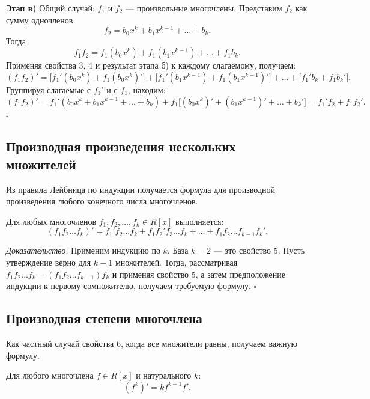 \documentclass[a4paper,12pt]{article}
\theoremstyle{definition}
\theoremstyle{plain}
\theoremstyle{remark}
\begin{document}
	\textbf{Этап в)} Общий случай: \( f_1 \) и \( f_2 \) — произвольные многочлены. Представим \( f_2 \) как сумму одночленов:
	\[
	f_2 = b_0 x^k + b_1 x^{k-1} + \dots + b_k.
	\]
	Тогда
	\[
	f_1 f_2 = f_1 (b_0 x^k) + f_1 (b_1 x^{k-1}) + \dots + f_1 b_k.
	\]
	Применяя свойства 3, 4 и результат этапа б) к каждому слагаемому, получаем:
	\[
	(f_1 f_2)' = \big[f_1' (b_0 x^k) + f_1 (b_0 x^k)'\big] + \big[f_1' (b_1 x^{k-1}) + f_1 (b_1 x^{k-1})'\big] + \dots + \big[f_1' b_k + f_1 b_k'\big].
	\]
	Группируя слагаемые с \( f_1' \) и с \( f_1 \), находим:
	\[
	(f_1 f_2)' = f_1' (b_0 x^k + b_1 x^{k-1} + \dots + b_k) + f_1 \big[(b_0 x^k)' + (b_1 x^{k-1})' + \dots + b_k'\big] = f_1' f_2 + f_1 f_2'.
	\]
	\hfill \(\square\)
	
	\subsection{Производная произведения нескольких множителей}
	
	Из правила Лейбница по индукции получается формула для производной произведения любого конечного числа многочленов.
	
	\begin{tcolorbox}[colback=blue!5, colframe=blue!40!black, title=Свойство 6]
		Для любых многочленов \( f_1, f_2, \dots, f_k \in R[x] \) выполняется:
		\[
		(f_1 f_2 \dots f_k)' = f_1' f_2 \dots f_k + f_1 f_2' f_3 \dots f_k + \dots + f_1 f_2 \dots f_{k-1} f_k'.
		\]
	\end{tcolorbox}
	
	\medskip
	\textit{Доказательство.}
	Применим индукцию по \( k \). База \( k = 2 \) — это свойство 5. Пусть утверждение верно для \( k-1 \) множителей. Тогда, рассматривая \( f_1 f_2 \dots f_k = (f_1 f_2 \dots f_{k-1}) f_k \) и применяя свойство 5, а затем предположение индукции к первому сомножителю, получаем требуемую формулу. \hfill \(\square\)
	
	\subsection{Производная степени многочлена}
	
	Как частный случай свойства 6, когда все множители равны, получаем важную формулу.
	
	\begin{tcolorbox}[colback=blue!5, colframe=blue!40!black, title=Свойство 7]
		Для любого многочлена \( f \in R[x] \) и натурального \( k \):
		\[
		(f^k)' = k f^{k-1} f'.
		\]
	\end{tcolorbox}
	
\end{document}
